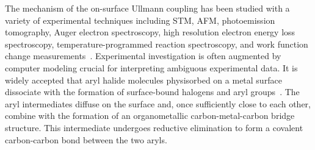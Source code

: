 \documentclass[journal=jacsat,manuscript=article]{achemso}
\newcommand{\lock}{\color{red}}
\newcommand{\lock}{\color{black}}
\newcommand{\sinfo}{Supplementary Information}
\begin{document}




{\lock

The mechanism of the on-surface Ullmann coupling has been studied with a variety of experimental techniques including STM, AFM, photoemission tomography, Auger electron spectroscopy, high resolution electron energy loss spectroscopy, temperature-programmed reaction spectroscopy, and work function change measurements~\cite{ullmann_143, sur_sci01, ullmann_141, ullmann_142, ullmann_87, sur_sci02, ullmann_144}. Experimental investigation is often augmented by computer modeling crucial for interpreting ambiguous experimental data.
%
%
%
It is widely accepted that aryl halide molecules physisorbed on a metal surface dissociate with the formation of surface-bound halogens and aryl groups~\cite{ullmann_145, sur_sci01, ullmann_87, sur_sci03}. The aryl intermediates diffuse on the surface and, once sufficiently close to each other, combine with the formation of an organometallic carbon-metal-carbon bridge structure. This intermediate undergoes reductive elimination to form a covalent carbon-carbon bond between the two aryls. %

}
\end{document}
